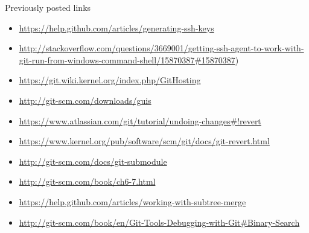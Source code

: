 \documentclass[10pt,a4paper]{beamer}
\begin{document}
\begin{frame}{Previously posted links}
\begin{itemize}
\item \href{http://git-scm.com/downloads/guis}{\color{blue}https://help.github.com/articles/generating-ssh-keys}
\item \href{http://stackoverflow.com/questions/3669001/getting-ssh-agent-to-work-with-git-run-from-windows-command-shell/15870387\#15870387}{\color{blue}http://stackoverflow.com/questions/3669001/getting-ssh-agent-to-work-with-git-run-from-windows-command-shell/15870387\#15870387})
\item \href{http://git-scm.com/downloads/guis}{\color{blue}https://git.wiki.kernel.org/index.php/GitHosting}
\item \href{http://git-scm.com/downloads/guis}{\color{blue}http://git-scm.com/downloads/guis} \\
\item \href{https://www.atlassian.com/git/tutorial/undoing-changes\#!revert}{\color{blue}https://www.atlassian.com/git/tutorial/undoing-changes\#!revert}
\item \href{https://www.kernel.org/pub/software/scm/git/docs/git-revert.html}{\color{blue}https://www.kernel.org/pub/software/scm/git/docs/git-revert.html}
\item \href{http://git-scm.com/docs/git-submodule}{\color{blue}http://git-scm.com/docs/git-submodule}
\item \href{http://git-scm.com/book/ch6-7.html}{\color{blue}http://git-scm.com/book/ch6-7.html}
\item \href{https://help.github.com/articles/working-with-subtree-merge}{\color{blue}https://help.github.com/articles/working-with-subtree-merge}
\item \href{http://git-scm.com/book/en/Git-Tools-Debugging-with-Git\#Binary-Search}{\color{blue}http://git-scm.com/book/en/Git-Tools-Debugging-with-Git\#Binary-Search}
\end{itemize}
\end{frame}
\end{document}
